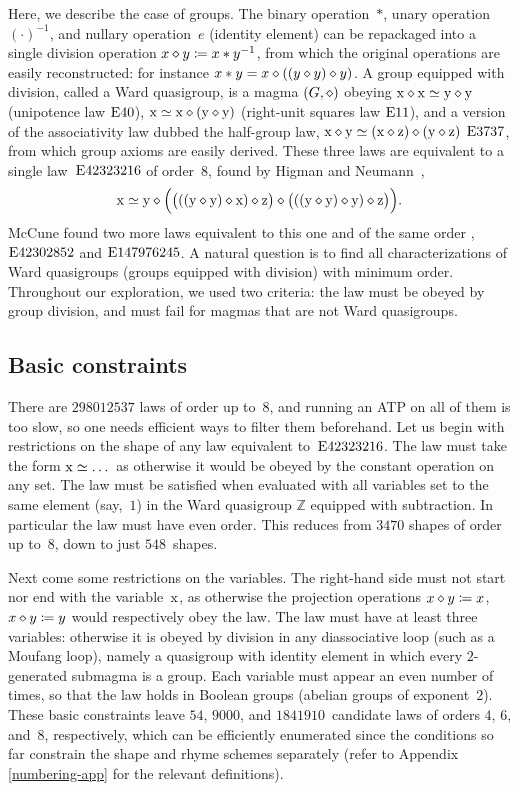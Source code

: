 Here, we describe the case of groups.  The binary operation~$*$, unary operation~$(\cdot )^{-1}$, and nullary operation~$e$ (identity element) can be repackaged into a single division operation $x \diamond y \coloneqq x*y^{-1}$, from which the original operations are easily reconstructed: for instance $x*y=x\diamond((y\diamond y)\diamond y)$.  A group equipped with division, called a Ward quasigroup, is a magma $(G, \diamond)$ obeying $\mathrm{x} \diamond \mathrm{x} \simeq \mathrm{y} \diamond \mathrm{y}$ (unipotence law $\mathrm{E}40$), $\mathrm{x} \simeq \mathrm{x} \diamond (\mathrm{y} \diamond \mathrm{y})$ (right-unit squares law $\mathrm{E}11$), and a version of the associativity law dubbed the half-group law, $\mathrm{x} \diamond \mathrm{y} \simeq (\mathrm{x} \diamond \mathrm{z}) \diamond (\mathrm{y} \diamond \mathrm{z})$ $\mathrm{E}3737$, from which group axioms are easily derived.
These three laws are equivalent to a single law~$\mathrm{E}42323216$ of order~$8$, found by Higman and Neumann~\cite{higman-neumann},
\[
\mathrm{x} \simeq \mathrm{y} \diamond \Bigl(\bigl(((\mathrm{y} \diamond \mathrm{y}) \diamond \mathrm{x}) \diamond \mathrm{z}\bigr) \diamond \bigl(((\mathrm{y} \diamond \mathrm{y}) \diamond \mathrm{y}) \diamond \mathrm{z}\bigr)\Bigr) .
\]
McCune found two more laws equivalent to this one and of the same order \cite{mccune1993single}, $\mathrm{E}42302852$ and $\mathrm{E}147976245$.  A natural question is to find all characterizations of Ward quasigroups (groups equipped with division) with minimum order.
Throughout our exploration, we used two criteria: the law must be obeyed by group division, and must fail for magmas that are not Ward quasigroups.

\subsection{Basic constraints}

There are $\num{298012537}$ laws of order up to~$8$, and running an ATP on all of them is too slow, so one needs efficient ways to filter them beforehand.  Let us begin with restrictions on the shape of any law equivalent to~$\mathrm{E}42323216$.
The law must take the form $\mathrm{x}\simeq\dots$ as otherwise it would be obeyed by the constant operation on any set.
The law must be satisfied when evaluated with all variables set to the same element (say,~$1$) in the Ward quasigroup $\mathbb{Z}$ equipped with subtraction.  In particular the law must have even order.
This reduces from $\num{3470}$ shapes of order up to~$8$, down to just $548$~shapes.

Next come some restrictions on the variables.
The right-hand side must not start nor end with the variable~$\mathrm{x}$, as otherwise the projection operations $x\diamond y \coloneqq x$, $x\diamond y\coloneqq y$ would respectively obey the law.
The law must have at least three variables: otherwise it is obeyed by division in any diassociative loop (such as a Moufang loop), namely a quasigroup with identity element in which every $2$-generated submagma is a group.
Each variable must appear an even number of times, so that the law holds in Boolean groups (abelian groups of exponent~$2$).
These basic constraints leave $54$, $\num{9000}$, and $\num{1841910}$~candidate laws of orders $4$, $6$, and~$8$, respectively, which can be efficiently enumerated since the conditions so far constrain the shape and rhyme schemes separately (refer to Appendix \ref{numbering-app} for the relevant definitions).

